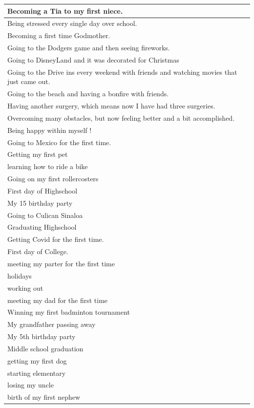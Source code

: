 \documentclass[
  .7em,
  letterpaper,
  DIV=11,
  numbers=noendperiod]{scrartcl}
\begin{document}
\begin{table}
\begin{tabular}{l}
\hline
Becoming a Tia to my first niece.\\
\hline
Being stressed every single day over school.\\
\hline
Becoming a first time Godmother.\\
\hline
Going to the Dodgers game and then seeing fireworks.\\
\hline
Going to DisneyLand and it was decorated for Christmas\\
\hline
Going to the Drive ins every weekend with friends and watching movies that just came out.\\
\hline
Going to the beach and having a bonfire with friends.\\
\hline
Having another surgery, which means now I have had three surgeries.\\
\hline
Overcoming many obstacles, but now feeling better and a bit accomplished.\\
\hline
Being happy within myself !\\
\hline
Going to Mexico for the first time.\\
\hline
Getting my first pet\\
\hline
learning how to ride a bike\\
\hline
Going on my first rollercosters\\
\hline
First day of Highschool\\
\hline
My 15 birthday party\\
\hline
Going to Culican Sinaloa\\
\hline
Graduating Highschool\\
\hline
Getting Covid for the first time.\\
\hline
First day of College.\\
\hline
meeting my parter for the first time\\
\hline
holidays\\
\hline
working out\\
\hline
meeting my dad for the first time\\
\hline
Winning my first badminton tournament\\
\hline
My grandfather passing away\\
\hline
My 5th birthday party\\
\hline
Middle school graduation\\
\hline
getting my first dog\\
\hline
starting elementary\\
\hline
losing my uncle\\
\hline
birth of my first nephew\\

\end{tabular}
\end{table}
\end{document}
